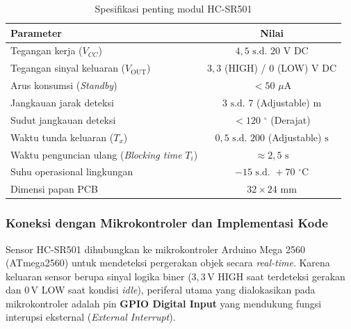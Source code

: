 \begin{table}[H]
	\centering
	\caption{Spesifikasi penting modul HC-SR501}
	\label{tab:hc_sr501_spesifikasi}
	\small
	\begin{tabularx}{\textwidth}{@{}Xc@{}}
		\toprule
		Parameter                                             & Nilai             \\
		\midrule
		Tegangan kerja ($V_{CC}$)                             & $4{,}5 \text{ s.d. } 20$ $\text{V DC}$      \\
		Tegangan sinyal keluaran ($V_{\text{OUT}}$)           & $3{,}3$ (HIGH) / $0$ (LOW) $\text{V DC}$      \\
		Arus konsumsi (\textit{Standby})                      & $< 50$ $\mu\text{A}$      \\
		Jangkauan jarak deteksi                               & $3 \text{ s.d. } 7$ (Adjustable) $\text{m}$         \\
		Sudut jangkauan deteksi                               & $< 120$ $^\circ$ (Derajat) \\
		Waktu tunda keluaran ($T_x$)                          & $0{,}5 \text{ s.d. } 200$ (Adjustable) $\text{s}$         \\
		Waktu penguncian ulang (\textit{Blocking time} $T_i$) & $\approx 2{,}5$ $\text{s}$         \\
		Suhu operasional lingkungan                           & $-15 \text{ s.d. } +70$ $^\circ\text{C}$   \\
		Dimensi papan PCB                                     & $32 \times 24$ $\text{mm}$        \\
		\bottomrule
	\end{tabularx}
\end{table}

\subsubsection{Koneksi dengan Mikrokontroler dan Implementasi Kode}
Sensor HC-SR501 dihubungkan ke mikrokontroler Arduino Mega 2560 (ATmega2560) untuk mendeteksi pergerakan objek secara \textit{real-time}. Karena keluaran sensor berupa sinyal logika biner ($3{,}3\,\text{V}$ HIGH saat terdeteksi gerakan dan $0\,\text{V}$ LOW saat kondisi \textit{idle}), periferal utama yang dialokasikan pada mikrokontroler adalah pin \textbf{GPIO Digital Input} yang mendukung fungsi interupsi eksternal (\textit{External Interrupt}).

